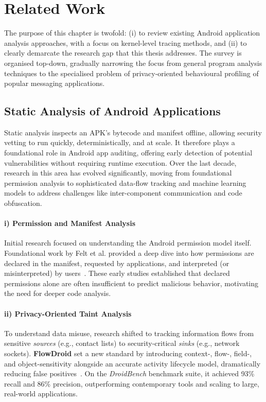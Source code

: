 \documentclass[a4paper,12pt]{report}
\begin{document}

\chapter{Related Work}\label{ch:related}

The purpose of this chapter is twofold: (i) to review existing Android application analysis approaches, with a focus on kernel-level tracing methods, and (ii) to
clearly demarcate the research gap that this thesis addresses.  The survey is
organised top‑down, gradually narrowing the focus from general program analysis
techniques to the specialised problem of privacy‑oriented behavioural
profiling of popular messaging applications.

\section{Static Analysis of Android Applications}
\label{sec:rw:static}

Static analysis inspects an APK's bytecode and manifest offline, allowing security vetting to run quickly, deterministically, and at scale. It therefore plays a foundational role in Android app auditing, offering early detection of potential vulnerabilities without requiring runtime execution. Over the last decade, research in this area has evolved significantly, moving from foundational permission analysis to sophisticated data-flow tracking and machine learning models to address challenges like inter-component communication and code obfuscation.

\subsubsection{i) Permission and Manifest Analysis}
Initial research focused on understanding the Android permission model itself. Foundational work by Felt et al. provided a deep dive into how permissions are declared in the manifest, requested by applications, and interpreted (or misinterpreted) by users~\cite{felt2011androidprivacy}. These early studies established that declared permissions alone are often insufficient to predict malicious behavior, motivating the need for deeper code analysis.

\subsubsection{ii) Privacy-Oriented Taint Analysis}
To understand data misuse, research shifted to tracking information flows from sensitive \emph{sources} (e.g., contact lists) to security-critical \emph{sinks} (e.g., network sockets). \textbf{FlowDroid} set a new standard by introducing context-, flow-, field-, and object-sensitivity alongside an accurate activity lifecycle model, dramatically reducing false positives~\cite{arzt2014flowdroid}. On the \emph{DroidBench} benchmark suite, it achieved 93\% recall and 86\% precision, outperforming contemporary tools and scaling to large, real-world applications.
\end{document}
